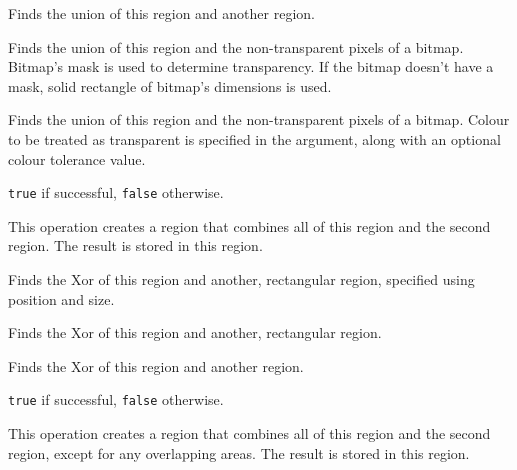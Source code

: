 
Finds the union of this region and another region.


Finds the union of this region and the non-transparent pixels of a
bitmap. Bitmap's mask is used to determine transparency. If the bitmap doesn't
have a mask, solid rectangle of bitmap's dimensions is used.


Finds the union of this region and the non-transparent pixels of a
bitmap. Colour to be treated as transparent is specified in the
 argument, along with an
optional colour tolerance value.


{\tt true} if successful, {\tt false} otherwise.


This operation creates a region that combines all of this region and the second region.
The result is stored in this region.


\label{wxregionxor}


Finds the Xor of this region and another, rectangular region, specified using position and size.


Finds the Xor of this region and another, rectangular region.


Finds the Xor of this region and another region.


{\tt true} if successful, {\tt false} otherwise.


This operation creates a region that combines all of this region and the second region, except
for any overlapping areas. The result is stored in this region.


\label{wxregionassign}


